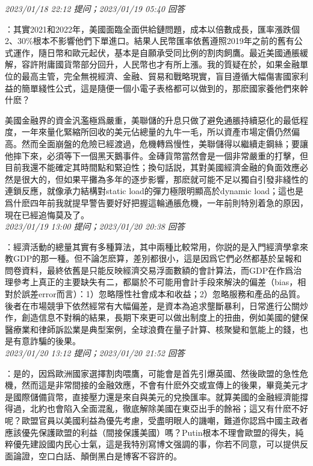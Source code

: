 \documentclass[twocolumn]{ctexart}
\begin{document}
\textit{\hfill\noindent\small 2023/01/18 22:12 提问；2023/01/19 05:40 回答}

：其實2021和2022年，美國面臨全面供給鏈問題，成本以倍數成長，匯率漲跌個2、30\%根本不影響他們下單進口。結果人民幣匯率依舊遵照2019年之前的舊有公式運作，隨日幣和歐元起伏，基本是自願承受同比例的割肉飼鷹。最近美國通脹緩解，容許附庸國貨幣部分回升，人民幣也才有所上漲。我的質疑在於，如果金融單位的最高主管，完全無視經濟、金融、貿易和戰略現實，盲目遵循大幅傷害國家利益的簡單綫性公式，這是隨便一個小電子表格都可以做到的，那麽國家養他們來幹什麽？

美國金融界的資金汎濫極爲嚴重，美聯儲的升息只做了避免通脹持續惡化的最低程度，一年來量化緊縮所回收的美元佔總量的九牛一毛，所以資產市場定價仍然偏高。然而全面崩盤的危險已經渡過，危機轉爲慢性，美聯儲得以繼續走鋼絲；要讓他摔下來，必須等下一個黑天鵝事件。金磚貨幣當然會是一個非常嚴重的打擊，但目前我還不能確定其時間點和緊迫性；換句話説，其對美國經濟金融的負面效應必然是很大的，但如果平攤為多年的逐步影響，那麽就可能不足以獨自引發非綫性的連鎖反應，就像承力結構對static load的彈力極限明顯高於dynamic load；這也是爲什麽四年前我就提早警告要好好把握這輪通脹危機，一年前則特別着急的原因，現在已經追悔莫及了。
\\

\textit{\hfill\noindent\small 2023/01/19 13:00 提问；2023/01/20 20:38 回答}

：經濟活動的總量其實有多種算法，其中兩種比較常用，你説的是入門經濟學拿來教GDP的那一種。但不論怎麽算，差別都很小，這是因爲它們必然都基於呈報和問卷資料，最終依舊是只能反映經濟交易浮面數額的會計算法，而GDP在作爲治理參考上真正的主要缺失有二，都屬於不可能用會計手段來解決的偏差（bias，相對於誤差error而言）：1）忽略隱性社會成本和收益；2）忽略服務和產品的品質。後者在市場競爭下依然經常有大幅偏差，是資本為追求壟斷暴利，日常進行公關炒作，創造信息不對稱的結果，長期下來更可以做出制度上的扭曲，例如美國的健保醫療業和律師訴訟業是典型案例，全球浪費在量子計算、核聚變和氫能上的錢，也是有意詐騙的後果。
\\

\textit{\hfill\noindent\small 2023/01/20 13:12 提问；2023/01/20 21:52 回答}

：是的，因爲歐洲國家選擇割肉喂鷹，可能會是首先引爆英國、然後歐盟的急性危機，然而這是非常間接的金融效應，不會有什麽外交或宣傳上的後果，畢竟美元才是國際儲備貨幣，直接壓力還是來自與美元的兌換匯率。就算美國的金融經濟能撐得過，北約也會陷入全面混亂，徹底解除美國在東亞出手的餘裕；這又有什麽不好呢？歐盟官員以美國利益為優先考慮，受盡明眼人的譏嘲，難道你認爲中國主政者應該優先保護歐盟的利益（間接保護美國）嗎？Putin根本不理會歐盟的得失，純粹優先建設國内民心士氣，這是我特別寫博文强調的事，你若不同意，可以提供反面論證，空口白話、顛倒黑白是博客不容許的。
\\
\end{document}
